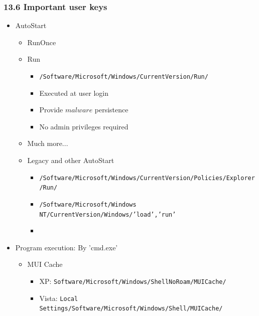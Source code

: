 \begin{frame}[fragile]
  \frametitle{13.6 Important user keys}
   \begin{itemize}
      \item AutoStart
      \begin{itemize}
          \item RunOnce
          \item Run
              \begin{itemize}
		      \item \texttt{\scriptsize{/Software/Microsoft/Windows/CurrentVersion/Run/}}
                  \item Executed at user login
                  \item Provide \(malware\) persistence
                  \item No admin privileges required
              \end{itemize}
          \item Much more... 
          \item Legacy and other AutoStart
              \begin{itemize}
		      \item \texttt{\scriptsize{/Software/Microsoft/Windows/CurrentVersion/Policies/Explorer/Run/}}
		      \item \texttt{\scriptsize{/Software/Microsoft/Windows NT/CurrentVersion/Windows/'load','run'}}
		      \item[]
              \end{itemize}
      \end{itemize}
      \item Program execution: By 'cmd.exe'
      \begin{itemize}
          \item MUI Cache
          \begin{itemize}
              \item XP: \texttt{\scriptsize{Software/Microsoft/Windows/ShellNoRoam/MUICache/}}
              \item Vista:  \texttt{\scriptsize{Local Settings/Software/Microsoft/Windows/Shell/MUICache/}}
          \end{itemize}
      \end{itemize}
   \end{itemize}
\end{frame}



